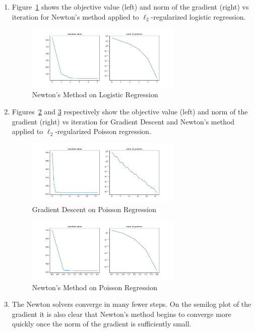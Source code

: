 \documentclass[10pt]{article}
\begin{document}
\begin{solution}[Solution]
\begin{enumerate}[label=(\alph*)]
    \item
        Figure~\ref{logistic_nm} shows the objective value (left) and norm of the gradient (right) vs iteration for Newton's method applied to \( \ell_2 \)-regularized logistic regression.
        \begin{figure}\centering
            \includegraphics[width=0.7\textwidth]{img/logistic_nm.pdf}
            \caption{Newton's Method on Logistic Regression}
            \label{logistic_nm}
        \end{figure}
    \item
        Figures~\ref{poisson_gd} and \ref{poisson_nm} respectively show the objective value (left) and norm of the gradient (right) vs iteration for Gradient Descent and Newton's method applied to \( \ell_2 \)-regularized Poisson regression.
        \begin{figure}\centering
            \includegraphics[width=0.7\textwidth]{img/poisson_gd.pdf}
            \caption{Gradient Descent on Poisson Regression}
            \label{poisson_gd}
        \end{figure}
        \begin{figure}\centering
            \includegraphics[width=0.7\textwidth]{img/poisson_nm.pdf}
            \caption{Newton's Method on Poisson Regression}
            \label{poisson_nm}
        \end{figure}
 

    \item The Newton solvers converge in many fewer steps. On the semilog plot of the gradient it is also clear that Newton's method begins to converge more quickly once the norm of the gradient is sufficiently small.

\end{enumerate}
\end{solution}
\end{document}

